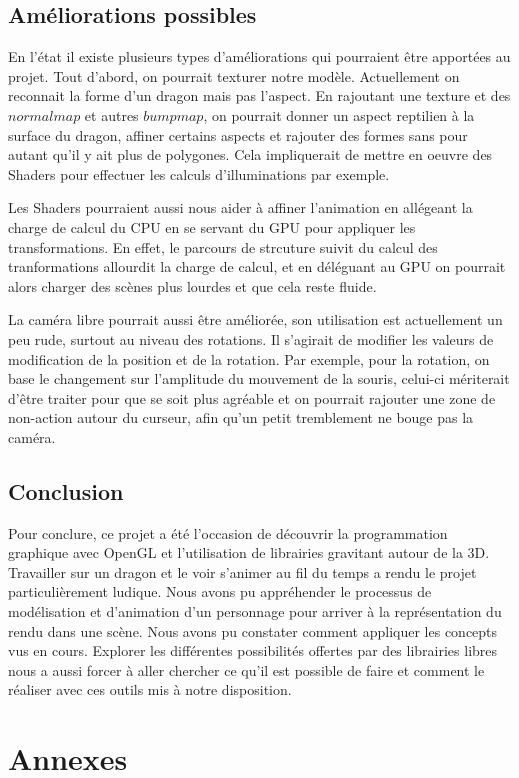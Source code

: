 \documentclass[a4paper]{report}
\begin{document}
\section{Améliorations possibles}
\par
En l'état il existe plusieurs types d'améliorations qui pourraient être apportées au projet. Tout d'abord, on pourrait texturer notre modèle. Actuellement on reconnait la forme d'un dragon mais pas l'aspect. En rajoutant une texture et des $normal map$ et autres $bump map$, on pourrait donner un aspect reptilien à la surface du dragon, affiner certains aspects et rajouter des formes sans pour autant qu'il y ait plus de polygones. Cela impliquerait de mettre en oeuvre des Shaders pour effectuer les calculs d'illuminations par exemple. 

Les Shaders pourraient aussi nous aider à affiner l'animation en allégeant la charge de calcul du CPU en se servant du GPU pour appliquer les transformations. En effet, le parcours de strcuture suivit du calcul des tranformations allourdit la charge de calcul, et en déléguant au GPU on pourrait alors charger des scènes plus lourdes et que cela reste fluide. 

La caméra libre pourrait aussi être améliorée, son utilisation est actuellement un peu rude, surtout au niveau des rotations. Il s'agirait de modifier les valeurs de modification de la position et de la rotation. Par exemple, pour la rotation, on base le changement sur l'amplitude du mouvement de la souris, celui-ci mériterait d'être traiter pour que se soit plus agréable et on pourrait rajouter une zone de non-action autour du curseur, afin qu'un petit tremblement ne bouge pas la caméra.

\section{Conclusion}
\par
Pour conclure, ce projet a été l'occasion de découvrir la programmation graphique avec OpenGL et l'utilisation de librairies gravitant autour de la 3D. Travailler sur un dragon et le voir s'animer au fil du temps a rendu le projet particulièrement ludique.
Nous avons pu appréhender le processus de modélisation et d'animation d'un personnage pour arriver à la représentation du rendu dans une scène. Nous avons pu constater comment appliquer les concepts vus en cours. Explorer les différentes possibilités offertes par des librairies libres nous a aussi forcer à aller chercher ce qu'il est possible de faire et comment le réaliser avec ces outils mis à notre disposition.


\newpage
\chapter{Annexes}
\end{document}
